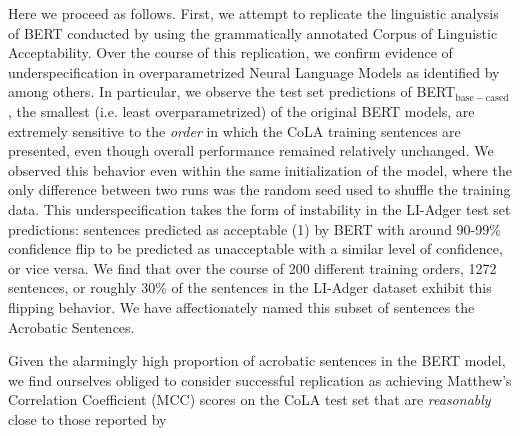 Here we proceed as follows. First, we attempt to replicate the linguistic analysis of BERT conducted by \DIFdelbegin {}\DIFdelend \DIFaddbegin {}\DIFaddend using the grammatically annotated Corpus of Linguistic Acceptability.  Over the course of this replication, we confirm evidence of underspecification in overparametrized Neural Language Models as identified by \DIFdelbegin {}\DIFdelend \DIFaddbegin {}\DIFaddend among others.  In particular, we observe the test set predictions of BERT$_{\mathrm{base-cased}}$, the smallest (i.e. least overparametrized) of the original BERT models, are extremely sensitive to the {\em order} in which the CoLA training sentences are presented, even though overall performance remained relatively unchanged.  We observed this behavior even within the same initialization of the model, where the only difference between two runs was the random seed used to shuffle the training data.  This underspecification takes the form of instability in the LI-Adger test set predictions: sentences predicted as acceptable (1) by BERT with around 90-99\% confidence flip to be predicted as unacceptable with a similar level of confidence, or vice versa.  We find that over the course of 200 different training orders, 1272 sentences, or roughly 30\% of the sentences in the LI-Adger dataset exhibit this flipping behavior.  We have affectionately named this subset of sentences the Acrobatic Sentences.

Given the alarmingly high proportion of acrobatic sentences in the \DIFdelbegin {}\DIFdelend \DIFaddbegin {}\DIFaddend BERT model, we find ourselves obliged to consider successful replication as achieving Matthew's Correlation Coefficient (MCC) scores on the CoLA test set that are \textit{reasonably} close to those reported by \DIFdelbegin {}\DIFdelend \DIFaddbegin {}

